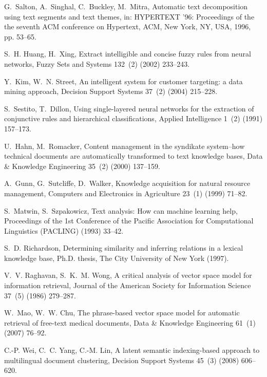 \documentclass{elsart}
\begin{document}
\begin{thebibliography}{10}
G.~Salton, A.~Singhal, C.~Buckley, M.~Mitra, Automatic text decomposition using
  text segments and text themes, in: HYPERTEXT '96: Proceedings of the the
  seventh ACM conference on Hypertext, ACM, New York, NY, USA, 1996, pp.
  53--65.


S.~H. Huang, H.~Xing,
 {Extract intelligible and concise fuzzy rules from
  neural networks}, Fuzzy Sets and Systems 132~(2) (2002) 233--243.


Y.~Kim, W.~N. Street,
  {An intelligent system for customer targeting: a data
  mining approach}, Decision Support Systems 37~(2) (2004) 215--228.


S.~Sestito, T.~Dillon, {Using
  single-layered neural networks for the extraction of conjunctive rules and
  hierarchical classifications}, Applied Intelligence 1~(2) (1991) 157--173.


U.~Hahn, M.~Romacker,
 {Content management in the syndikate system--how
  technical documents are automatically transformed to text knowledge bases},
  Data \& Knowledge Engineering 35~(2) (2000) 137--159.


A.~Gunn, G.~Sutcliffe, D.~Walker,
  {Knowledge acquisition for natural resource
  management}, Computers and Electronics in Agriculture 23~(1) (1999) 71--82.


S.~Matwin, S.~Szpakowicz, Text analysis: How can machine learning help,
  Proceedings of the 1st Conference of the Pacific Association for
  Computational Linguistics (PACLING) (1993) 33--42.

S.~D. Richardson, Determining similarity and inferring relations in a lexical
  knowledge base, Ph.D. thesis, The City University of New York (1997).

V.~V. Raghavan, S.~K.~M. Wong,
 {A critical analysis of vector space model for information retrieval},
  Journal of the American Society for Information Science 37~(5) (1986)
  279--287.

W.~Mao, W.~W. Chu,
 {The phrase-based vector space model for automatic
  retrieval of free-text medical documents}, Data \& Knowledge Engineering
  61~(1) (2007) 76--92.


C.-P. Wei, C.~C. Yang, C.-M. Lin,
  {A latent semantic indexing-based approach to
  multilingual document clustering}, Decision Support Systems 45~(3) (2008)
  606--620.



\end{thebibliography}
\end{document}
